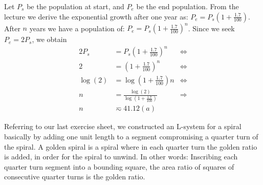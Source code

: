 \documentclass[10pt,a4paper,boxed]{hmcpset}
\begin{document}
\begin{problem}[Assignment 31]
\end{problem}
\begin{solution}
Let $P_s$ be the population at start, and $P_e$ be the end population.
From the lecture we derive the exponential growth after one year as: $P_e = P_s \left( 1 + \frac{1.7}{100} \right)$.
After $n$ years we have a population of: $P_e = P_s \left( 1 + \frac{1.7}{100} \right)^n$. Since we seek $P_e = 2 P_s$, we obtain
\begin{align*}
	2 P_s & = P_s \left( 1 + \frac{1.7}{100} \right)^n & \Leftrightarrow \\
	2 & = \left( 1 + \frac{1.7}{100} \right)^n & \Leftrightarrow \\
	\log(2) & = \log \left( 1 + \frac{1.7}{100} \right) n & \Leftrightarrow \\
	n & = \frac{\log(2)}{\log \left( 1 + \frac{1.7}{100} \right)} & \Rightarrow \\
	n & \eqsim 41.12 (a)
\end{align*}
\end{solution}



\begin{problem}[Assignment 34]
\end{problem}
\begin{solution}
Referring to our last exercise sheet, we constructed an L-system for a spiral basically by adding one unit length to a segment compromising a quarter turn of the spiral. A golden spiral is a spiral where in each quarter turn the golden ratio is added, in order for the spiral to unwind. In other words: Inscribing each quarter turn segment into a bounding square, the area ratio of squares of consecutive quarter turns is the golden ratio.
\end{solution}
\end{document}
